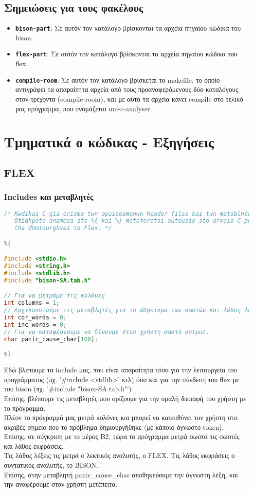\documentclass[14pt]{extarticle}
\begin{document}
\subsection{Σημειώσεις για τους φακέλους}
\begin{itemize}
\item \texttt{\textbf{bison-part}}:
Σε αυτόν τον κατάλογο βρίσκονται τα αρχεία πηγαίου κώδικα του bison.
\item \texttt{\textbf{flex-part}}:
Σε αυτόν τον κατάλογο βρίσκονται τα αρχεία πηγαίου κώδικα του flex.
\item \texttt{\textbf{compile-room}}:
Σε αυτόν τον κατάλογο βρίσκεται το makefile, το οποίο αντιγράφει τα απαραίτητα
αρχεία από τους προαναφερόμενους δύο καταλόγους στον τρέχοντα (compile-room),
και με αυτά τα αρχεία κάνει compile στο τελικό μας πρόγραμμα, που ονομάζεται
uni-c-analyser.
\end{itemize}

\clearpage
\section{Τμηματικά ο κώδικας - Εξηγήσεις}

\subsection{FLEX}
\subsubsection{Includes και μεταβλητές}
\begin{lstlisting}[language=C]
/* Kwdikas C gia orismo twn apaitoumenwn header files kai twn metablhtwn.
   Otidhpote anamesa sta %{ kai %} metaferetai autousio sto arxeio C pou
   tha dhmiourghsei to Flex. */

%{

#include <stdio.h>
#include <string.h>
#include <stdlib.h>
#include "bison-SA.tab.h"

// Για να μετράμε τις κολόνες
int columns = 1;
// Αρχικοποιούμε τις μεταβλητές για το άθροισμα των σωστών και λάθος λέξεων
int cor_words = 0;
int inc_words = 0;
// Για να καταφέρνουμε να δίνουμε στον χρήστη σωστό output.
char panic_cause_char[100];

%}
\end{lstlisting}
Εδώ βλέπουμε τα include μας, που είναι απαραίτητα τόσο για την λειτουργεία του
προγράμματος (πχ. '\#include <stdlib>' κτλ) όσο και για την σύνδεση του flex με
του bison (πχ. '\#include "bison-SA.tab.h"')
\\
Επίσης, βλέπουμε τις μεταβλητές που ορίζουμε για την ομαλή διεπαφή του χρήστη
με το πρόγραμμα.
\\
Πλέον το πρόγραμμά μας μετρά κολόνες και μπορεί να κατευθύνει τον χρήστη στο
ακριβές σημείο που το πρόβλημα δημιουργήθηκε (με κάποιο άγνωστο token).
\\
Επίσης, σε σύγκριση με το μέρος B2, τώρα το πρόγραμμα μετρά σωστά τις σωστές
και λάθος εκφράσεις. 
\\
Τις λάθος λέξεις τις μετρά ο λεκτικός αναλυτής, ο FLEX.
Τις λάθος εκφράσεις ο συντατικός αναλυτής, το BISON.
\\
Επίσης, στην μεταβλητή panic\_cause\_char αποθηκεύουμε την άγνωστη λέξη, και την
αναφέρουμε στον χρήστη μετέπειτα.
\end{document}
